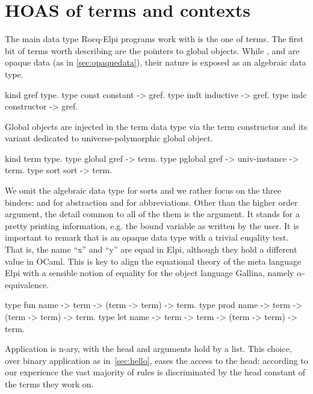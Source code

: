 \documentclass[a4paper, 11pt]{book}
\begin{document}
\section{HOAS of terms and contexts}\label{GALLINA}

The main data type Rocq-Elpi programs work with is the one of
terms. The first bit of terms worth describing are the pointers
to global objects. While , 
 and  are opaque
data (as in \ref{sec:opaquedata}), their nature is exposed as
an algebraic data type.

\begin{elpicode}
kind gref type.
type const constant -> gref.            %
type indt  inductive -> gref.           %
type indc  constructor -> gref.         %
\end{elpicode}

Global objects are injected in the term data type via the
 term constructor and its variant
 dedicated to universe-polymorphic global
object.

\begin{elpicode}
kind term type.
type global  gref -> term.
type pglobal gref -> univ-instance -> term.
type sort    sort -> term.                 %
\end{elpicode}

We omit the algebraic data type for sorts and we rather focus on the
three binders:  and  for abstraction
and  for abbreviations.
Other than the higher order argument, the detail common
to all of the them is the  argument. It stands for
a pretty printing information, e.g. the bound variable as written by
the user. It is important to remark that  is
an opaque data type with a trivial euqality test. That is, the
name ``x'' and ``y'' are equal in Elpi, although they hold a
different value in OCaml. This is key to align the equational theory
of the meta language Elpi with a sensible notion of equality for
the object language Gallina, namely $\alpha$-equivalence.

\begin{elpicode}
type fun  name -> term -> (term -> term) -> term.            %
type prod name -> term -> (term -> term) -> term.            %
type let  name -> term -> term -> (term -> term) -> term.    %
\end{elpicode}

Application is n-ary, with the head and arguments hold by a list.
This choice, over binary application as in~\ref{sec:hello}, eases
the access to the head: according to our experience the vast majority
of rules is discriminated by the head constant of the terms they work on.
\end{document}
